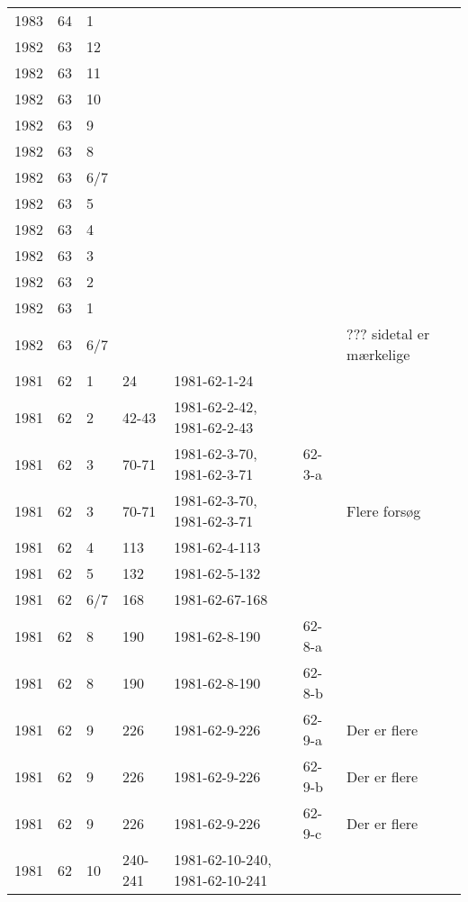 \begin{longtable}{ |l|l|l|l|p{2.7cm}|l|p{2cm}| }
 1983 & 64 &     1 &         &                &  & \\
 1982 & 63 &    12 &         &                &  & \\
 1982 & 63 &    11 &         &                &  & \\
 1982 & 63 &    10 &         &                &  & \\
 1982 & 63 &     9 &         &                &  & \\
 1982 & 63 &     8 &         &                &  & \\
 1982 & 63 &   6/7 &         &                &  & \\
 1982 & 63 &     5 &         &                &  & \\
 1982 & 63 &     4 &         &                &  & \\
 1982 & 63 &     3 &         &                &  & \\
 1982 & 63 &     2 &         &                &  & \\
 1982 & 63 &     1 &         &                &  & \\
 1982 & 63 &   6/7 &         &                &  & ??? sidetal er mærkelige \\
 1981 & 62 &     1 &      24 &   1981-62-1-24 &  & \\
 1981 & 62 &     2 &   42-43 & 1981-62-2-42, 1981-62-2-43 &  & \\
 1981 & 62 &     3 &   70-71 & 1981-62-3-70, 1981-62-3-71 & 62-3-a & \\
 1981 & 62 &   3 &   70-71 & 1981-62-3-70, 1981-62-3-71 &  & Flere forsøg \\
 1981 & 62 &     4 &     113 &  1981-62-4-113 &  & \\
 1981 & 62 &     5 &     132 &  1981-62-5-132 &  & \\
 1981 & 62 &   6/7 &     168 & 1981-62-67-168 &  & \\
 1981 & 62 &     8 &     190 &  1981-62-8-190 & 62-8-a & \\
 1981 & 62 &     8 &     190 &  1981-62-8-190 & 62-8-b & \\
 1981 & 62 &     9 &     226 &  1981-62-9-226 &  62-9-a & Der er flere \\
 1981 & 62 &     9 &     226 &  1981-62-9-226 &  62-9-b & Der er flere \\
 1981 & 62 &     9 &     226 &  1981-62-9-226 &  62-9-c & Der er flere \\
 1981 & 62 &    10 & 240-241 & 1981-62-10-240, 1981-62-10-241 &  & \\

\end{longtable}
